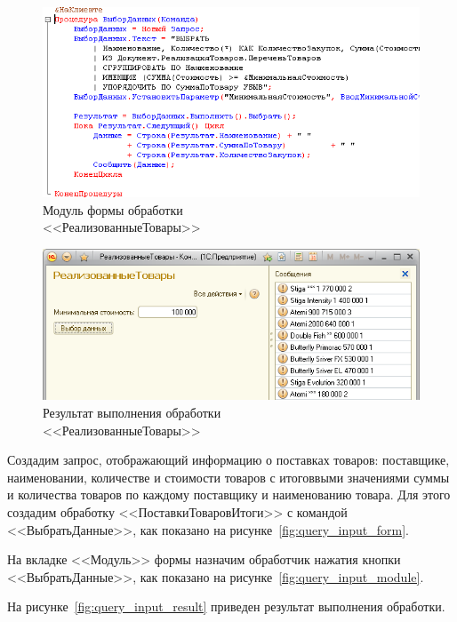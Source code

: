 \begin{figure}[h!]
  \centering
  \includegraphics[width=130mm]{pic/query_output_module}
  \caption{Модуль формы обработки \\ <<РеализованныеТовары>>}
  \label{fig:query_output_module}
\end{figure}

\begin{figure}[h!]
  \centering
  \includegraphics[width=150mm]{pic/query_output_result}
  \caption{Результат выполнения обработки \\ <<РеализованныеТовары>>}
  \label{fig:query_output_result}
\end{figure}

\pagebreak

Создадим запрос, отображающий информацию о поставках товаров:
поставщике, наименовании, количестве и стоимости товаров с итоговвыми
значениями суммы и количества товаров по каждому поставщику
и наименованию товара.
Для этого создадим обработку <<ПоставкиТоваровИтоги>>
с командой <<ВыбратьДанные>>,
как показано на рисунке~\ref{fig:query_input_form}.

На вкладке <<Модуль>> формы назначим обработчик нажатия кнопки
<<ВыбратьДанные>>, как показано на рисунке~\ref{fig:query_input_module}.

На рисунке~\ref{fig:query_input_result} приведен результат
выполнения обработки.

